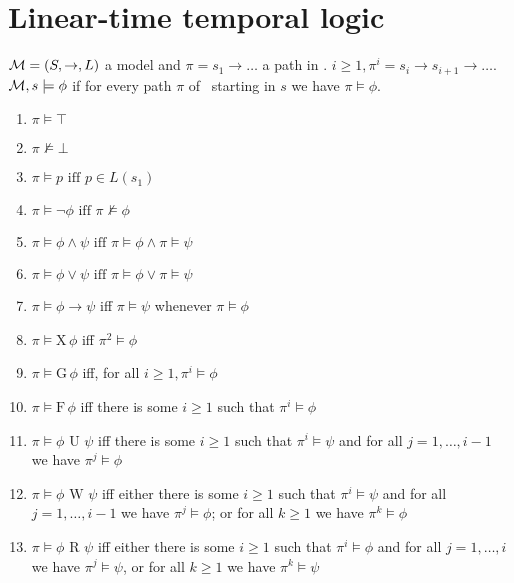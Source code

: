 \documentclass[10pt,a4paper]{article}
\begin{document}
\newpage

\section*{Linear-time temporal logic}

$\mathcal{M} = (S, \to, L)$ a model and $\pi = s_1 \to \dots$ a path in \model. $i≥1, \pi^i = s_i \to s_{i+1} \to \dots$. $\mathcal{M}, s \models \phi$ if for every path $\pi$ of \model\ starting in $s$ we have $\pi \models \phi$.

\renewcommand{\iff}{\ensuremath{\text{ iff }}}

\newcommand{\X}{\ensuremath{\text{X}\,}}
\newcommand{\G}{\ensuremath{\text{G}\,}}
\newcommand{\F}{\ensuremath{\text{F}\,}}

\begin{enumerate}
  \item $\pi \models \top$
  \item $\pi \not\models \bot$
  \item $\pi \models p \iff p \in L(s_1)$
  \item $\pi \models \neg \phi \iff \pi \not\models \phi$
  \item $\pi \models \phi \land \psi \iff \pi \models \phi \land \pi \models \psi$
  \item $\pi \models \phi \lor \psi \iff \pi \models \phi \lor \pi \models \psi$
  \item $\pi \models \phi \to \psi$ iff $\pi \models \psi$ whenever $\pi \models \phi$
  \item $\pi \models \X \phi$ iff $\pi^2 \models \phi$
  \item $\pi \models \G \phi$ iff, for all $i ≥ 1, \pi^i \models \phi$
  \item $\pi \models \F \phi$ iff there is some $i ≥ 1$ such that $\pi^i \models \phi$
  \item $\pi \models \phi \text{ U } \psi$ iff there is some $i ≥ 1$ such that $\pi^i \models \psi$ and for all $j = 1,\dots, i-1$ we have $\pi^j \models \phi$
  \item $\pi \models \phi \text{ W } \psi$ iff either there is some $i ≥ 1$ such that $\pi^i \models \psi$ and for all $j = 1, \dots, i-1$ we have $\pi^j \models \phi$; or for all $k ≥ 1$ we have $\pi^k \models \phi$
  \item $\pi \models \phi \text{ R } \psi$ iff either there is some $i ≥ 1$ such that $\pi^i \models \phi$ and for all $j=1,\dots,i$ we have $\pi^j \models \psi$, or for all $k≥1$ we have $\pi^k \models \psi$
\end{enumerate}
\end{document}
